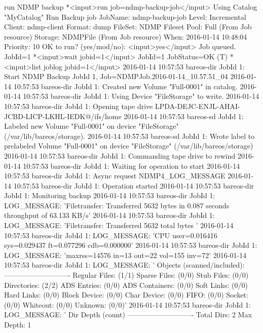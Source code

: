 \begin{bconsole}{run NDMP backup}
*<input>run job=ndmp-backup-job</input>
Using Catalog "MyCatalog"
Run Backup job
JobName:  ndmp-backup-job
Level:    Incremental
Client:   ndmp-client
Format:   dump
FileSet:  NDMP Fileset
Pool:     Full (From Job resource)
Storage:  NDMPFile (From Job resource)
When:     2016-01-14 10:48:04
Priority: 10
OK to run? (yes/mod/no): <input>yes</input>
Job queued. JobId=1
*<input>wait jobid=1</input>
JobId=1
JobStatus=OK (T)
*<input>list joblog jobid=1</input>
 2016-01-14 10:57:53 bareos-dir JobId 1: Start NDMP Backup JobId 1, Job=NDMPJob.2016-01-14_10.57.51_04
 2016-01-14 10:57:53 bareos-dir JobId 1: Created new Volume "Full-0001" in catalog.
 2016-01-14 10:57:53 bareos-dir JobId 1: Using Device "FileStorage" to write.
 2016-01-14 10:57:53 bareos-dir JobId 1: Opening tape drive LPDA-DEJC-ENJL-AHAI-JCBD-LICP-LKHL-IEDK@/ifs/home%
 2016-01-14 10:57:53 bareos-sd JobId 1: Labeled new Volume "Full-0001" on device "FileStorage" (/var/lib/bareos/storage).
 2016-01-14 10:57:53 bareos-sd JobId 1: Wrote label to prelabeled Volume "Full-0001" on device "FileStorage" (/var/lib/bareos/storage)
 2016-01-14 10:57:53 bareos-dir JobId 1: Commanding tape drive to rewind
 2016-01-14 10:57:53 bareos-dir JobId 1: Waiting for operation to start
 2016-01-14 10:57:53 bareos-dir JobId 1: Async request NDMP4_LOG_MESSAGE
 2016-01-14 10:57:53 bareos-dir JobId 1: Operation started
 2016-01-14 10:57:53 bareos-dir JobId 1: Monitoring backup
 2016-01-14 10:57:53 bareos-dir JobId 1: LOG_MESSAGE: 'Filetransfer: Transferred 5632 bytes in 0.087 seconds throughput of 63.133 KB/s'
 2016-01-14 10:57:53 bareos-dir JobId 1: LOG_MESSAGE: 'Filetransfer: Transferred 5632 total bytes '
 2016-01-14 10:57:53 bareos-dir JobId 1: LOG_MESSAGE: 'CPU  user=0.016416  sys=0.029437  ft=0.077296  cdb=0.000000'
 2016-01-14 10:57:53 bareos-dir JobId 1: LOG_MESSAGE: 'maxrss=14576  in=13  out=22  vol=155  inv=72'
 2016-01-14 10:57:53 bareos-dir JobId 1: LOG_MESSAGE: '
        Objects (scanned/included):
        ----------------------------
        Regular Files:          (1/1)
        Sparse Files:           (0/0)
        Stub Files:             (0/0)
        Directories:            (2/2)
        ADS Entries:            (0/0)
        ADS Containers:         (0/0)
        Soft Links:             (0/0)
        Hard Links:             (0/0)
        Block Device:           (0/0)
        Char Device:            (0/0)
        FIFO:                   (0/0)
        Socket:                 (0/0)
        Whiteout:               (0/0)
        Unknown:                (0/0)'
 2016-01-14 10:57:53 bareos-dir JobId 1: LOG_MESSAGE: '
        Dir Depth (count)
        ----------------------------
        Total Dirs:             2
        Max Depth:              1


\end{bconsole}
